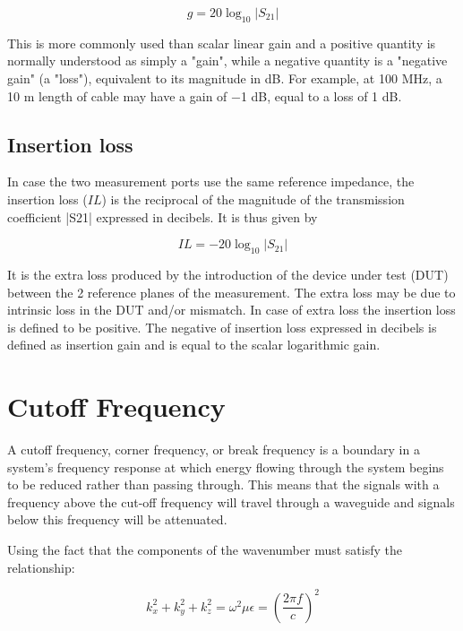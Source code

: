 \documentclass[a4paper,12pt]{report}
\begin{document}
\begin{equation}
  g = 20 \log_{10}|S_{21}|
\end{equation}

This is more commonly used than scalar linear gain
and a positive quantity is normally understood as simply a "gain",
while a negative quantity is a "negative gain" (a "loss"),
equivalent to its magnitude in dB.
For example, at 100 MHz,
a 10 m length of cable may have a gain of −1 dB,
equal to a loss of 1 dB.

\subsection{Insertion loss}

In case the two measurement ports use the same reference
impedance, the insertion loss ($IL$) is the reciprocal of the magnitude of the transmission coefficient |S21| expressed in decibels.
It is thus given by

\begin{equation}
  IL = -20\log_10|S_{21}|
\end{equation}

It is the extra loss produced by the introduction of
the device under test (DUT)
between the 2 reference planes of the measurement.
The extra loss may be due to intrinsic loss in the
DUT and/or mismatch.
In case of extra loss the insertion loss is defined to be
positive. The negative of insertion loss expressed in
decibels is defined as insertion gain and is equal to the
scalar logarithmic gain.


\section{Cutoff Frequency}

A cutoff frequency, corner frequency, or break frequency
is a boundary in a system's frequency response at which
energy flowing through the system begins to be reduced
rather than passing through.
This means that the signals with a frequency above the cut-off frequency
will travel through a waveguide and signals below this frequency
will be attenuated.

Using the fact that
the components of the wavenumber must satisfy the relationship:

\begin{equation}
  k_x^2 + k_y^2 + k_z^2 = \omega^2\mu\epsilon = \left(\frac{2\pi f}{c}\right)^2
\end{equation}
\end{document}
